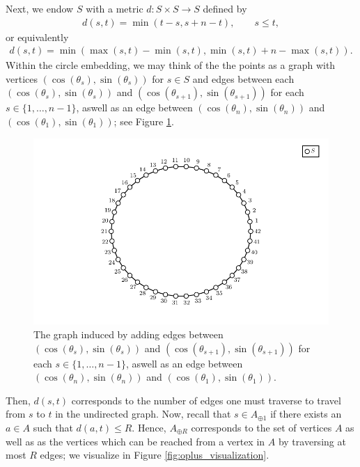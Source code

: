 \documentclass{article}
\begin{document}
Next, we endow $S$ with a metric $d:S \times S \to S$ defined by 
\begin{align*}
    d(s,t) = \min\left(t - s, s + n - t\right),\quad \quad s \leq t,
\end{align*}
or equivalently
\begin{align*}
    d(s,t) = \min\left(\max(s,t) - \min(s,t), \min(s,t) + n - \max(s,t)\right).
\end{align*}
Within the circle embedding, we may think of the the points as a graph with vertices $(\cos(\theta_s), \sin(\theta_s))$ for $s \in S$ and edges between each $(\cos(\theta_s), \sin(\theta_s))$ and $(\cos(\theta_{s + 1}), \sin(\theta_{s + 1}))$ for each $s \in \{1,\dots, n - 1\}$, aswell as an edge between $(\cos(\theta_n), \sin(\theta_n))$ and $(\cos(\theta_1), \sin(\theta_1))$; see Figure \ref{fig:circle-graph}.
\begin{figure}[ht]
    \centering
    \includegraphics[scale = 0.6]{figures/circle_graph.pdf}
    \caption{The graph induced by adding edges between $(\cos(\theta_s), \sin(\theta_s))$ and $(\cos(\theta_{s + 1}), \sin(\theta_{s + 1}))$ for each $s \in \{1,\dots, n - 1\}$, aswell as an edge between $(\cos(\theta_n), \sin(\theta_n))$ and $(\cos(\theta_1), \sin(\theta_1))$.}\label{fig:circle-graph}
\end{figure}
Then, $d(s,t)$ corresponds to the number of edges one must traverse to travel from $s$ to $t$ in the undirected graph. Now, recall that $s \in A_{\oplus 1}$ if there exists an $a \in A$ such that $d(a,t) \leq R$. Hence, $A_{\oplus R}$ corresponds to the set of vertices $A$ as well as as the vertices which can be reached from a vertex in $A$ by traversing at most $R$ edges; we visualize in Figure \ref{fig:oplus_visualization}.\\\\ 
\end{document}
